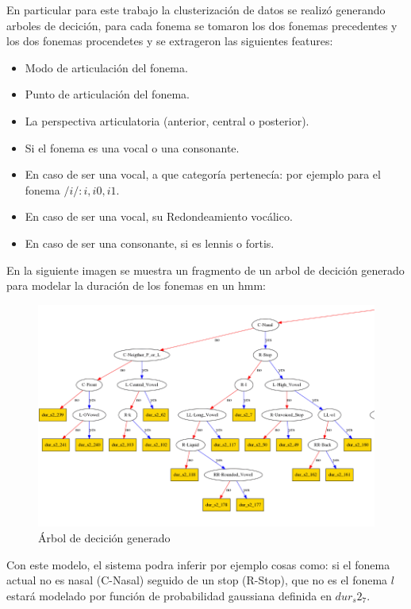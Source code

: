 En particular para este trabajo la clusterización de datos se realizó generando arboles de decición, para cada fonema se tomaron los dos fonemas precedentes y los dos fonemas procendetes y se extrageron las siguientes features:

\begin{itemize}
\item Modo de articulación del fonema.
\item Punto de articulación del fonema.
\item La perspectiva articulatoria (anterior, central o posterior).
\item Si el fonema es una vocal o una consonante.
\item En caso de ser una vocal, a que categoría pertenecía: por ejemplo para el fonema $/i/: {i, i0,i1}$.
\item En caso de ser una vocal, su Redondeamiento vocálico.
\item En caso de ser una consonante, si es lennis o fortis.
\end{itemize}

En la siguiente imagen se muestra un fragmento de un arbol de decición generado para modelar la duración de los fonemas en un hmm:

\begin{figure}[H]
\begin{center}
\includegraphics[scale=0.4]{imagenes/arbolDeDesicionTesis.png}
\caption{Árbol de decición generado}
\end{center}
\end{figure}
Con este modelo, el sistema podra inferir por ejemplo cosas como: si el fonema actual no es nasal (C-Nasal) seguido de un stop (R-Stop), que no es el fonema $l$ estará modelado por función de probabilidad gaussiana definida en $dur_s2_7$.

